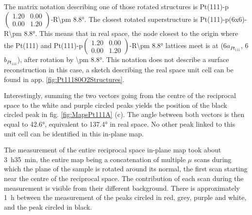 The matrix notation describing one of those rotated structures is Pt(111)-p$\begin{pmatrix} 1.20 & 0.00\\ 0.00 & 1.20 \end{pmatrix}$-R\ang{\pm 8.8}.
The closest rotated superstructure is Pt(111)-p(6x6)-R\ang{\pm 8.8}.
This means that in real space, the node closest to the origin where the Pt(111) and Pt(111)-p$\begin{pmatrix} 1.20 & 0.00\\ 0.00 & 1.20 \end{pmatrix}$-R\ang{\pm 8.8} lattices meet is at (6$a_{Pt_{111}}$, 6$b_{Pt_{111}}$), after rotation by \ang{\pm 8.8}.
This notation does not describe a surface reconstruction in this case, a sketch describing the real space unit cell can be found in app. \ref{fig:Pt11180O2Structures}.

Interestingly, summing the two vectors going from the centre of the reciprocal space to the white and purple circled peaks yields the position of the black circled peak in fig. \ref{fig:MapsPt111A} (c).
The angle between both vectors is then equal to \ang{42.6}, equivalent to \ang{137.4} in real space.
No other peak linked to this unit cell can be identified in this in-plane map.


The measurement of the entire reciprocal space in-plane map took about \qty{3}{\hour}\qty{35}{\minute}, the entire map being a concatenation of multiple $\mu$ scans during which the plane of the sample is rotated around its normal, the first scan starting near the centre of the reciprocal space.
The contribution of each scan during the measurement is visible from their different background.
There is approximately \qty{1}{\hour} between the measurement of the peaks circled in red, grey, purple and white, and the peak circled in black.

